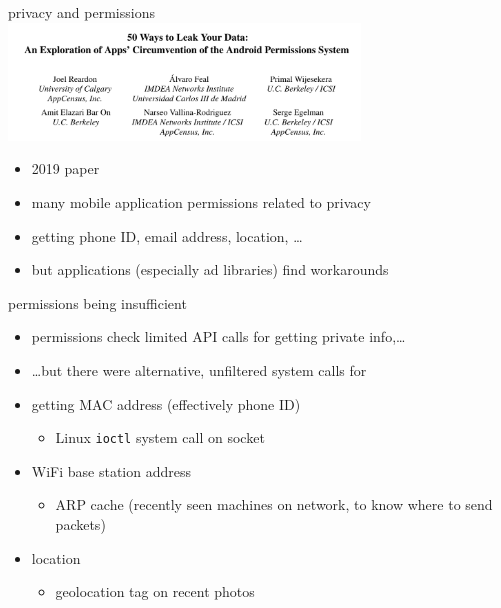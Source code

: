 \begin{frame}{privacy and permissions}
\includegraphics[width=0.7\textwidth]{../sandbox/priv-and-perm}
    \begin{itemize}
    \item 2019 paper
    \item many mobile application permissions related to privacy
    \item getting phone ID, email address, location, \ldots
    \item but applications (especially ad libraries) find workarounds
    \end{itemize}
\end{frame}

\begin{frame}{permissions being insufficient}
    \begin{itemize}
    \item permissions check limited API calls for getting private info,\ldots
    \item \ldots but there were alternative, unfiltered system calls for
    \vspace{.5cm}
    \item getting MAC address (effectively phone ID)
        \begin{itemize}
        \item Linux \texttt{ioctl} system call on socket
        \end{itemize}
    \item WiFi base station address
        \begin{itemize}
        \item ARP cache (recently seen machines on network, to know where to send packets)
        \end{itemize}
    \item location
        \begin{itemize}
        \item geolocation tag on recent photos
        \end{itemize}
    \end{itemize}
\end{frame}

